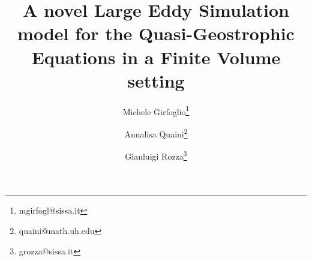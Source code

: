 \documentclass[11pt,a4paper]{article}
\begin{document}

\date{}
\title{A novel Large Eddy Simulation model for the Quasi-Geostrophic Equations in a Finite Volume setting}
\author[1]{Michele Girfoglio\thanks{mgirfogl@sissa.it}}
\author[2]{Annalisa Quaini\thanks{quaini@math.uh.edu}}
\author[1]{Gianluigi Rozza\thanks{grozza@sissa.it}}
\maketitle









\end{document}
